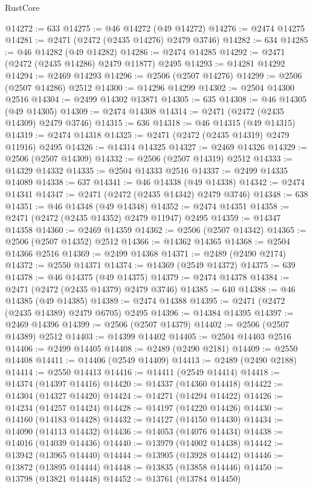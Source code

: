 \begin{lexlean}{RustCore}
\begin{coremodule}
@14272 := 633
@14275 := @46 @14272 (@49 @14272)
@14276 := @2474 @14275
@14281 := @2471 (@2472 (@2435 @14276) @2479 @3746)
@14282 := 634
@14285 := @46 @14282 (@49 @14282)
@14286 := @2474 @14285
@14292 := @2471 (@2472 (@2435 @14286) @2479 @11877) @2495
@14293 := @14281 @14292
@14294 := @2469 @14293
@14296 := @2506 (@2507 @14276)
@14299 := @2506 (@2507 @14286) @2512
@14300 := @14296 @14299
@14302 := @2504 @14300 @2516
@14304 := @2499 @14302 @13871
@14305 := 635
@14308 := @46 @14305 (@49 @14305)
@14309 := @2474 @14308
@14314 := @2471 (@2472 (@2435 @14309) @2479 @3746)
@14315 := 636
@14318 := @46 @14315 (@49 @14315)
@14319 := @2474 @14318
@14325 := @2471 (@2472 (@2435 @14319) @2479 @11916) @2495
@14326 := @14314 @14325
@14327 := @2469 @14326
@14329 := @2506 (@2507 @14309)
@14332 := @2506 (@2507 @14319) @2512
@14333 := @14329 @14332
@14335 := @2504 @14333 @2516
@14337 := @2499 @14335 @14089
@14338 := 637
@14341 := @46 @14338 (@49 @14338)
@14342 := @2474 @14341
@14347 := @2471 (@2472 (@2435 @14342) @2479 @3746)
@14348 := 638
@14351 := @46 @14348 (@49 @14348)
@14352 := @2474 @14351
@14358 := @2471 (@2472 (@2435 @14352) @2479 @11947) @2495
@14359 := @14347 @14358
@14360 := @2469 @14359
@14362 := @2506 (@2507 @14342)
@14365 := @2506 (@2507 @14352) @2512
@14366 := @14362 @14365
@14368 := @2504 @14366 @2516
@14369 := @2499 @14368
@14371 := @2489 (@2490 @2174)
@14372 := @2550 @14371
@14374 := @14369 (@2549 @14372)
@14375 := 639
@14378 := @46 @14375 (@49 @14375)
@14379 := @2474 @14378
@14384 := @2471 (@2472 (@2435 @14379) @2479 @3746)
@14385 := 640
@14388 := @46 @14385 (@49 @14385)
@14389 := @2474 @14388
@14395 := @2471 (@2472 (@2435 @14389) @2479 @6705) @2495
@14396 := @14384 @14395
@14397 := @2469 @14396
@14399 := @2506 (@2507 @14379)
@14402 := @2506 (@2507 @14389) @2512
@14403 := @14399 @14402
@14405 := @2504 @14403 @2516
@14406 := @2499 @14405
@14408 := @2489 (@2490 @2181)
@14409 := @2550 @14408
@14411 := @14406 (@2549 @14409)
@14413 := @2489 (@2490 @2188)
@14414 := @2550 @14413
@14416 := @14411 (@2549 @14414)
@14418 := @14374 (@14397 @14416)
@14420 := @14337 (@14360 @14418)
@14422 := @14304 (@14327 @14420)
@14424 := @14271 (@14294 @14422)
@14426 := @14234 (@14257 @14424)
@14428 := @14197 (@14220 @14426)
@14430 := @14160 (@14183 @14428)
@14432 := @14127 (@14150 @14430)
@14434 := @14090 (@14113 @14432)
@14436 := @14053 (@14076 @14434)
@14438 := @14016 (@14039 @14436)
@14440 := @13979 (@14002 @14438)
@14442 := @13942 (@13965 @14440)
@14444 := @13905 (@13928 @14442)
@14446 := @13872 (@13895 @14444)
@14448 := @13835 (@13858 @14446)
@14450 := @13798 (@13821 @14448)
@14452 := @13761 (@13784 @14450)

\end{coremodule}
\end{lexlean}
